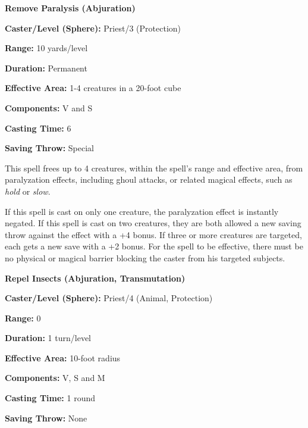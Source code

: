 \begin{multicols}{2}
\noindent
\begin{minipage}{\columnwidth}

\noindent \textbf{Remove Paralysis (Abjuration)}

\noindent \textbf{Caster/Level (Sphere):} Priest/3 (Protection)

\noindent \textbf{Range:} 10 yards/level

\noindent \textbf{Duration:} Permanent

\noindent \textbf{Effective Area:} 1-4 creatures in a 20-foot cube

\noindent \textbf{Components:} V and S

\noindent \textbf{Casting Time:} 6

\noindent \textbf{Saving Throw:} Special

\end{minipage}

This spell frees up to 4 creatures, within the spell's range and effective area, from paralyzation effects, including ghoul attacks, or related magical effects, such as \textit{hold} or \textit{slow}.  

If this spell is cast on only one creature, the paralyzation effect is instantly negated.  If this spell is cast on two creatures, they are both allowed a new saving throw against the effect with a +4 bonus.   If three or more creatures are targeted, each gets a new save with a +2 bonus.  For the spell to be effective, there must be no physical or magical barrier blocking the caster from his targeted subjects.

\vspace{1em}

\noindent
\begin{minipage}{\columnwidth}

\noindent \textbf{Repel Insects (Abjuration, Transmutation)}

\noindent \textbf{Caster/Level (Sphere):} Priest/4 (Animal, Protection)

\noindent \textbf{Range:} 0

\noindent \textbf{Duration:} 1 turn/level

\noindent \textbf{Effective Area:} 10-foot radius

\noindent \textbf{Components:} V, S and M

\noindent \textbf{Casting Time:} 1 round

\noindent \textbf{Saving Throw:} None

\end{minipage}


\end{multicols}
